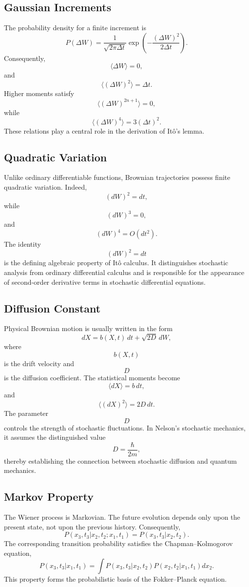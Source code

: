 \subsection{Gaussian Increments}
The probability density for a finite increment is
\[P(\Delta W)=\frac{1}{\sqrt{2\pi\Delta t}}\exp\left(
-\frac{(\Delta W)^2}{2\Delta t}\right).\]
Consequently,
\[\langle\Delta W\rangle=0,\]
and
\[\boxed{\langle(\Delta W)^2\rangle=\Delta t.}\]
Higher moments satisfy
\[\langle(\Delta W)^{2n+1}\rangle=0,\]
while
\[\langle(\Delta W)^4\rangle=3(\Delta t)^2.\]
These relations play a central role in the derivation of Itô's lemma.
\subsection{Quadratic Variation}
Unlike ordinary differentiable functions,
Brownian trajectories possess finite quadratic variation.
Indeed,
\[(dW)^2=dt,\]
while
\[(dW)^3=0,\]
and
\[(dW)^4=O(dt^2).\]
The identity
\[\boxed{(dW)^2=dt}\]
is the defining algebraic property of Itô calculus.
It distinguishes stochastic analysis from ordinary differential
calculus and is responsible for the appearance of second-order
derivative terms in stochastic differential equations.
\subsection{Diffusion Constant}
Physical Brownian motion is usually written in the form
\[dX=b(X,t)\,dt+\sqrt{2D}\,dW,\]
where
\[b(X,t)
\]
is the drift velocity and
\[D\]
is the diffusion coefficient.
The statistical moments become
\[\langle dX\rangle=b\,dt,\]
and
\[\boxed{\langle(dX)^2\rangle=2D\,dt.}\]
The parameter
\[D\]
controls the strength of stochastic fluctuations.
In Nelson's stochastic mechanics,
it assumes the distinguished value
\[\boxed{D=\frac{\hbar}{2m},}\]
thereby establishing the connection between stochastic diffusion and
quantum mechanics.
\subsection{Markov Property}
The Wiener process is Markovian.
The future evolution depends only upon the present state,
not upon the previous history.
Consequently,
\[P(x_3,t_3|x_2,t_2;x_1,t_1)=P(x_3,t_3|x_2,t_2).\]
The corresponding transition probability satisfies the
Chapman--Kolmogorov equation,
\[P(x_3,t_3|x_1,t_1)=\int P(x_3,t_3|x_2,t_2)P(x_2,t_2|x_1,t_1)dx_2.\]
This property forms the probabilistic basis of the Fokker--Planck
equation.
